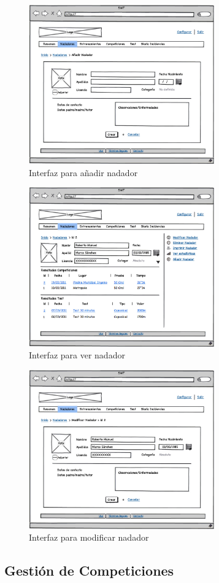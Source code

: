 	\begin{figure}[H]
	  \centering
	    \includegraphics[width=8cm]{./eps/11_Nadadores_new.eps}
	  \caption{Interfaz para añadir nadador}
	  \label{fig:interfaz_nadadores_new}
	\end{figure}
	
	\begin{figure}[H]
	  \centering
	    \includegraphics[width=8cm]{./eps/12_Nadadores_show.eps}
	  \caption{Interfaz para ver nadador}
	  \label{fig:interfaz_nadadores_show}
	\end{figure}
	
	\begin{figure}[H]
	  \centering
	    \includegraphics[width=8cm]{./eps/13_Nadadores_modif.eps}
	  \caption{Interfaz para modificar nadador}
	  \label{fig:interfaz_nadadores_modif}
	\end{figure}
	
	\subsection{Gestión de Competiciones} %
		\label{sub:gestion_de_competiciones}
	
	
